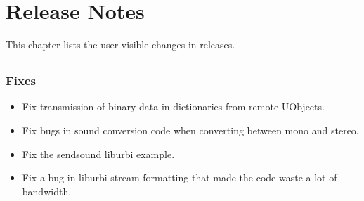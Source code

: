 
\chapter{Release Notes}
\label{sec:news}

This chapter lists the user-visible changes in \usdk releases.

\section{}

\subsection{Fixes}

\begin{itemize}
\item Fix transmission of binary data in dictionaries from remote UObjects.
\item Fix bugs in sound conversion code when converting between mono and stereo.
\item Fix the sendsound liburbi example.
\item Fix a bug in liburbi stream formatting that made the code waste a lot of
  bandwidth.
\end{itemize}

